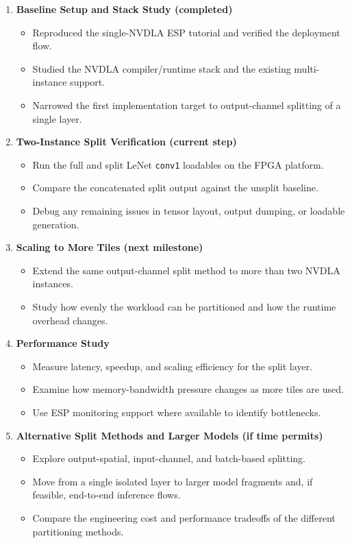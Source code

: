 \documentclass[10pt,sigconf,nonacm]{acmart}
\begin{document}
\begin{enumerate}
  \item \textbf{Baseline Setup and Stack Study (completed)}
  \begin{itemize}
      \item Reproduced the single-NVDLA ESP tutorial and verified the deployment flow.
      \item Studied the NVDLA compiler/runtime stack and the existing multi-instance support.
      \item Narrowed the first implementation target to output-channel splitting of a single layer.
  \end{itemize}

  \item \textbf{Two-Instance Split Verification (current step)}
  \begin{itemize}
      \item Run the full and split LeNet \texttt{conv1} loadables on the FPGA platform.
      \item Compare the concatenated split output against the unsplit baseline.
      \item Debug any remaining issues in tensor layout, output dumping, or loadable generation.
  \end{itemize}

  \item \textbf{Scaling to More Tiles (next milestone)}
  \begin{itemize}
      \item Extend the same output-channel split method to more than two NVDLA instances.
      \item Study how evenly the workload can be partitioned and how the runtime overhead changes.
  \end{itemize}

  \item \textbf{Performance Study}
  \begin{itemize}
      \item Measure latency, speedup, and scaling efficiency for the split layer.
      \item Examine how memory-bandwidth pressure changes as more tiles are used.
      \item Use ESP monitoring support where available to identify bottlenecks.
  \end{itemize}

  \item \textbf{Alternative Split Methods and Larger Models (if time permits)}
  \begin{itemize}
      \item Explore output-spatial, input-channel, and batch-based splitting.
      \item Move from a single isolated layer to larger model fragments and, if feasible, end-to-end inference flows.
      \item Compare the engineering cost and performance tradeoffs of the different partitioning methods.
  \end{itemize}
\end{enumerate}
\end{document}
